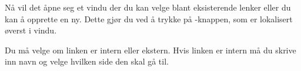 \begin{figure}[H]
    \centering
    \label{fig:cms-new-link}
\end{figure}

 Nå vil det åpne seg et vindu der du kan velge blant eksisterende lenker eller du kan å opprette en ny. Dette gjør du ved å trykke på -knappen, som er lokalisert øverst i vindu. 
 
 \begin{figure}[H]
    \centering
    \label{fig:cms-add-new-link}
\end{figure}

Du må velge om linken er intern eller ekstern. Hvis linken er intern må du skrive inn navn og velge hvilken side den skal gå til. 
 \begin{figure}[H]
    \centering
    \label{fig:cms-internal-link}
\end{figure}

